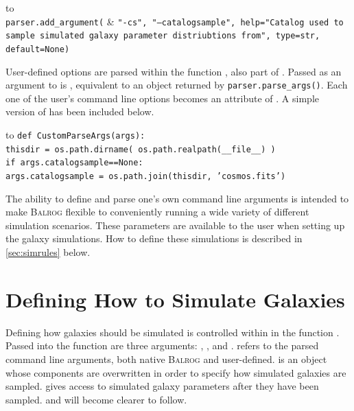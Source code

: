 \documentclass[12pt]{book}
\newcommand{\balrog}{\textsc{Balrog}}
\begin{document}
\setlength{\tabcolsep}{0pt}
\begin{longtabu*} to \linewidth {l X}
\\
\hspace{20pt} \texttt{parser.add\_argument(} & \texttt{"-cs", "--catalogsample", help="Catalog used to
sample simulated galaxy parameter distriubtions from", type=str, default=None)}
\end{longtabu*}
\setlength{\tabcolsep}{6pt}
\addtocounter{table}{-1}


User-defined options are parsed within the function \parsefunc{},
also part of \config{}.
Passed as an argument to \parsefunc{} is \parseargs{}, equivalent
to an object returned by \texttt{parser.parse\_args()}. Each one of the user's 
command line options becomes an attribute of \parseargs{}. 
A simple version of \parsefunc{} has been included below.

\setlength{\tabcolsep}{0pt}
\begin{longtabu*} to \linewidth {X}
\texttt{def CustomParseArgs(args):}\\
\hspace{20pt} \texttt{thisdir = os.path.dirname( os.path.realpath(\_\_file\_\_) )} \\
\hspace{20pt} \texttt{if args.catalogsample==None:} \\
\hspace{40pt} \texttt{args.catalogsample = os.path.join(thisdir, 'cosmos.fits')}
\end{longtabu*}
\setlength{\tabcolsep}{6pt}
\addtocounter{table}{-1}

\noindent The ability to define and parse one's own command line arguments is intended to make
\balrog{} flexible to conveniently running a wide variety of different
simulation scenarios. These parameters are available to the user 
when setting up the galaxy simulations. How to define these simulations is described in
\autoref{sec:simrules} below.

\chapter{Defining How to Simulate Galaxies}
\label{sec:simrules}

Defining how galaxies should be simulated is controlled within \config{}
in the function \simfunc{}. Passed into the function are three
arguments: \simargs{}, \simrules{}, and \simsamp{}.
\simargs{} refers to the parsed command line arguments,
both native \balrog{} and user-defined.
\simrules{} is an object whose components are overwritten
in order to specify how simulated galaxies are sampled.
\simsamp{} gives access to simulated galaxy parameters
after they have been sampled. \simrules{} and \simsamp{}
will become clearer to follow.
\end{document}
